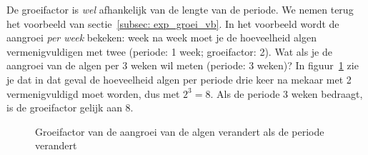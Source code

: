De groeifactor is \emph{wel} afhankelijk van de
lengte van de periode. We nemen terug het voorbeeld van sectie~\ref{subsec: exp_groei_vb}.  In het voorbeeld wordt de aangroei \emph{per week}  bekeken: week na week moet je de hoeveelheid algen vermenigvuldigen met twee (periode: 1 week; groeifactor: 2). Wat als je de aangroei van de algen per 3 weken wil meten (periode: 3 weken)? In figuur~\ref{fig:algen_periode} zie je dat in dat geval de hoeveelheid algen per periode drie keer na mekaar met 2 vermenigvuldigd moet worden, dus met $2^3=8$. Als de periode 3 weken bedraagt, is de groeifactor gelijk aan 8.
\begin{figure}[htbp]
    \centering
{}
    \caption{Groeifactor van de aangroei van de algen verandert als de periode verandert }
    \label{fig:algen_periode}
\end{figure}

